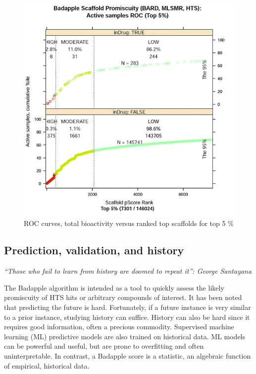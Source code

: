 \begin{figure}
	\includegraphics[width=\textwidth]{figures/badapple/Badapple_Fig4.png}
	\caption{ROC curves, total bioactivity versus ranked top scaffolds for top 5 \%}
	\label{fig:BA_04}
\end{figure}


\subsection{Prediction, validation, and history}

\emph{“Those who fail to learn from history are doomed to repeat it”: George Santayana}

The Badapple algorithm is intended as a tool to quickly assess the likely promiscuity of HTS hits or arbitrary compounds of interest. It has been noted that predicting the future is hard. Fortunately, if a future instance is very similar to a prior instance, studying history can suffice. History can also be hard since it requires good information, often a precious commodity. Supervised machine learning (ML) predictive models are also trained on historical data. ML models can be powerful and useful, but are prone to overfitting and often uninterpretable. In contrast, a Badapple score is a statistic, an algebraic function of empirical, historical data.

